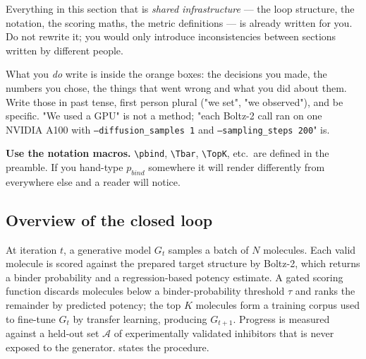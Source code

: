 \documentclass[11pt]{article}
\newcommand{\Gmodel}{G}                         %
\newcommand{\Actives}{\mathcal{A}}              %
\newcommand{\Ngen}{N}
\newcommand{\Kk}{K}
\begin{document}
\begin{guide}
Everything in this section that is \emph{shared infrastructure} --- the loop
structure, the notation, the scoring maths, the metric definitions --- is
already written for you. Do not rewrite it; you would only introduce
inconsistencies between sections written by different people.

\smallskip
What you \emph{do} write is inside the orange boxes: the decisions you made,
the numbers you chose, the things that went wrong and what you did about them.
Write those in past tense, first person plural ("we set", "we observed"),
and be specific. "We used a GPU" is not a method; "each Boltz-2 call ran on one
NVIDIA A100 with \texttt{--diffusion\_samples 1} and
\texttt{--sampling\_steps 200}" is.

\smallskip
\textbf{Use the notation macros.} \texttt{\textbackslash pbind}, \texttt{\textbackslash Tbar}, \texttt{\textbackslash TopK},
etc.\ are defined in the preamble. If you hand-type $p_{bind}$ somewhere it
will render differently from everywhere else and a reader will notice.
\end{guide}

\subsection{Overview of the closed loop}
\label{sec:methods:overview}

At iteration $t$, a generative model $\Gmodel_t$ samples a batch of
$\Ngen$ molecules. Each valid molecule is scored against the prepared target
structure by Boltz-2, which returns a binder probability and a regression-based
potency estimate. A gated scoring function discards molecules below a
binder-probability threshold $\tau$ and ranks the remainder by predicted
potency; the top $\Kk$ molecules form a training corpus used to fine-tune
$\Gmodel_t$ by transfer learning, producing $\Gmodel_{t+1}$. Progress is
measured against a held-out set $\Actives$ of experimentally validated
inhibitors that is never exposed to the generator.
 states the procedure.
\end{document}
